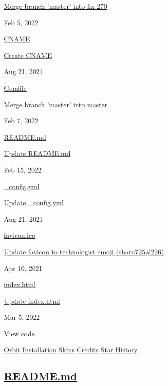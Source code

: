 \documentclass[english,]{article}
\begin{document}
{
\href{/alexpoulis/online-cv/commit/2c90b661dd6dfd77e48cc9845bf82bc1698d8cdd}{Merge
branch 'master' into fix-270} }

Feb 5, 2022

{\href{/alexpoulis/online-cv/blob/master/CNAME}{CNAME}}

{
\href{/alexpoulis/online-cv/commit/35c12fe73d8f337fe7e66ae6e900634b888a9db1}{Create
CNAME} }

Aug 21, 2021

{\href{/alexpoulis/online-cv/blob/master/Gemfile}{Gemfile}}

{
\href{/alexpoulis/online-cv/commit/b2db3ca1563f88710755c0541cbbec84c9e1084f}{Merge
branch 'master' into master} }

Feb 7, 2022

{\href{/alexpoulis/online-cv/blob/master/README.md}{README.md}}

{
\href{/alexpoulis/online-cv/commit/b515de8368ac1846ce5eee91113c5ecf3331c58d}{Update
README.md} }

Feb 15, 2022

{\href{/alexpoulis/online-cv/blob/master/_config.yml}{\_config.yml}}

{
\href{/alexpoulis/online-cv/commit/a21b6783120a2cc87748e2172dfd330041bc56da}{Update
\_config.yml} }

Aug 21, 2021

{\href{/alexpoulis/online-cv/blob/master/favicon.ico}{favicon.ico}}

{
\href{/alexpoulis/online-cv/commit/fec942c6e6587c5f566e70f555d6d676b8e58064}{Update
favicon to technologist emoji
(}\href{https://github.com/sharu725/online-cv/pull/226}{sharu725\#226}\href{/alexpoulis/online-cv/commit/fec942c6e6587c5f566e70f555d6d676b8e58064}{)}
}

Apr 10, 2021

{\href{/alexpoulis/online-cv/blob/master/index.html}{index.html}}

{
\href{/alexpoulis/online-cv/commit/ec6a3e6d620dc75b69746b7e8573fb0aa08ddc7a}{Update
index.html} }

Mar 5, 2022

View code

\hypertarget{readme}{}
\protect\hyperlink{orbit}{Orbit}
\protect\hyperlink{installation}{Installation}
\protect\hyperlink{skins}{Skins} \protect\hyperlink{credits}{Credits}
\protect\hyperlink{star-history}{Star History}

\hypertarget{readme.md}{%
\subsection{\texorpdfstring{\protect\hyperlink{readme}{README.md}}{README.md}}\label{readme.md}}
\end{document}

